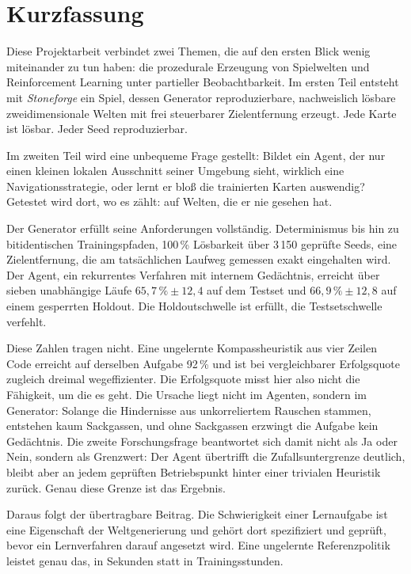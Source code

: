 \documentclass[11pt,a4paper]{article}
\let\sfOldSection\section
\renewcommand{\section}{\clearpage\sfOldSection}
\begin{document}
\section*{Kurzfassung}

Diese Projektarbeit verbindet zwei Themen, die auf den ersten Blick wenig
miteinander zu tun haben: die prozedurale Erzeugung von Spielwelten und
Reinforcement Learning unter partieller Beobachtbarkeit. Im ersten Teil
entsteht mit \emph{Stoneforge} ein Spiel, dessen Generator reproduzierbare,
nachweislich lösbare zweidimensionale Welten mit frei steuerbarer
Zielentfernung erzeugt. Jede Karte ist lösbar. Jeder Seed reproduzierbar.

Im
zweiten Teil wird eine unbequeme Frage gestellt: Bildet ein Agent, der nur
einen kleinen lokalen Ausschnitt seiner Umgebung sieht, wirklich eine
Navigationsstrategie, oder lernt er bloß die trainierten Karten auswendig?
Getestet wird dort, wo es zählt: auf Welten, die er nie gesehen hat.

Der Generator erfüllt seine Anforderungen vollständig. Determinismus bis hin zu
bitidentischen Trainingspfaden, 100\,\% Lösbarkeit über 3\,150 geprüfte Seeds,
eine Zielentfernung, die am tatsächlichen Laufweg gemessen exakt eingehalten
wird. Der Agent, ein rekurrentes Verfahren mit internem Gedächtnis, erreicht
über sieben unabhängige Läufe $65{,}7\,\% \pm 12{,}4$ auf dem Testset und
$66{,}9\,\% \pm 12{,}8$ auf einem gesperrten Holdout. Die Holdoutschwelle ist
erfüllt, die Testsetschwelle verfehlt.

Diese Zahlen tragen nicht. Eine ungelernte Kompassheuristik aus vier Zeilen
Code erreicht auf derselben Aufgabe 92\,\% und ist bei vergleichbarer
Erfolgsquote zugleich dreimal wegeffizienter. Die Erfolgsquote misst hier also
nicht die Fähigkeit, um die es geht. Die Ursache liegt nicht im Agenten,
sondern im Generator: Solange die Hindernisse aus unkorreliertem Rauschen
stammen, entstehen kaum Sackgassen, und ohne Sackgassen erzwingt die Aufgabe
kein Gedächtnis. Die zweite Forschungsfrage beantwortet sich damit nicht als
Ja oder Nein, sondern als Grenzwert: Der Agent übertrifft die
Zufallsuntergrenze deutlich, bleibt aber an jedem geprüften Betriebspunkt
hinter einer trivialen Heuristik zurück. Genau diese Grenze ist das
Ergebnis.

Daraus folgt der übertragbare Beitrag. Die Schwierigkeit einer Lernaufgabe ist
eine Eigenschaft der Weltgenerierung und gehört dort spezifiziert und geprüft,
bevor ein Lernverfahren darauf angesetzt wird. Eine ungelernte Referenzpolitik
leistet genau das, in Sekunden statt in Trainingsstunden.
\end{document}
